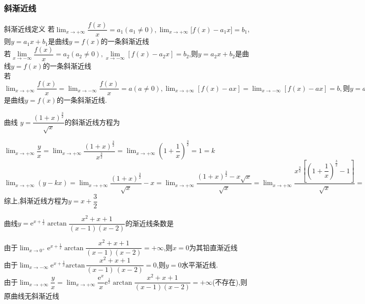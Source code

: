 \documentclass[8pt a4paper, oneside, UTF8]{ctexbook}  %
\begin{document}
\begin{sloppypar}
    \subsubsection{斜渐近线}
    \begin{defn}{斜渐近线定义}{}
        若$\lim_{x\to+\infty}\dfrac{f(x)}{x}=a_{1}(a_{1}\neq0),\lim_{x\to+\infty}\Big[f(x)-a_{1}x\Big]=b_{1}$,则$y=a_{1}x+b_{1}$是曲线$y=f(x)$的一条斜渐近线\\
        若$\lim\limits_{x\to-\infty}\dfrac{f(x)}{x}=a_2(a_2 \neq 0),\lim\limits_{x\to-\infty}\left[f(x)-a_2x\right]=b_2$,则$y=a_2x+b_2$是曲线$y=f(x)$的一条斜渐近线\\
        若$\lim_{x\to+\infty} \dfrac{f(x)}x=\lim_{x\to-\infty}\dfrac{f(x)}x=a(a\neq0),\lim_{x\to+\infty}\left[f(x)-ax\right]=\lim_{x\to-\infty}\left[f(x)-ax\right]=b,则y=ax+b$是曲线$y=f(x)$的一条斜渐近线.
    \end{defn}
    \begin{problem}
    曲线 $y=\dfrac{(1+x)^{\frac32}}{\sqrt x}$的斜渐近线方程为
    \end{problem}
    \begin{solution}
        $\lim_{x\to +\infty}\dfrac{y}{x}=\lim_{x\to+\infty}\dfrac{(1+x)^{\frac{3}{2}}}{x^{\frac{3}{2}}}=\lim_{x\to +\infty}(1+\dfrac{1}{x})^{\frac{3}{2}}=1=k$\\
        $\lim_{x\to +\infty}(y-kx)=\lim_{x\to +\infty}\dfrac{(1+x)^{\frac{3}{2}}}{\sqrt{x}}-x=\lim_{x\to +\infty}\dfrac{(1+x)^{\frac{3}{2}}-x\sqrt{x}}{\sqrt{x}}=\lim_{x\to +\infty}\dfrac{x^{\frac{3}{2}}[(1+\dfrac{1}{x})^{\frac{3}{2}}-1]}{\sqrt{x}}=\lim_{x\to+\infty}\dfrac{x^{\frac32}\cdot\dfrac32\cdot\dfrac1x}{\sqrt{x}}=\dfrac{3}{2}=b$\\
        综上,斜渐近线方程为$y=x+\dfrac{3}{2}$
    \end{solution}
    \begin{problem}
    曲线$y=\mathrm{e}^{x+\frac1x}\arctan\dfrac{x^2+x+1}{(x-1)(x-2)}$的渐近线条数是
    \end{problem}
    \begin{solution}
        由于$\operatorname*{lim}_{x\to0^{+}}\mathrm{e}^{x+\frac{1}{x}}\operatorname{arctan}\dfrac{x^{2}+x+1}{(x-1)\left(x-2\right)}=+\infty$,则$x=0$为其铅直渐近线\\
        由于$\operatorname*{lim}_{x\to-\infty}\mathrm{e}^{x+\frac{1}{x}}\mathrm{arctan}\,\dfrac{x^{2}+x+1}{(x-1)\,(x-2)}=0$,则$y=0$水平渐近线.\\
        由于$\operatorname* {l i m}_{x \to+\infty} {\dfrac{y} {x}}=\operatorname* {l i m}_{x \to+\infty} {\dfrac{\mathrm{e}^{x}} {x}} \mathrm{e}^{\frac{1} {x}} \arctan{\dfrac{x^{2}+x+1} {\left( x-1 \right) \left( x-2 \right)}}=+\infty$(不存在),则原曲线无斜渐近线\\

\end{solution}
\end{sloppypar}
\end{document}

